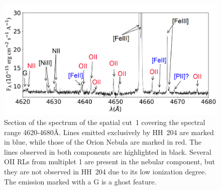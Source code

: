 \documentclass[twocolumn]{aastex63}
\begin{document}
\begin{figure}
\centering
\includegraphics[width=\columnwidth]{range_of_rls.pdf}
\caption{Section of the spectrum of the spatial cut~1 covering the spectral range 4620-4680\AA. Lines emitted exclusively by HH~204 are marked in blue, while those of the Orion Nebula are marked in red. The lines observed in both components are highlighted in black. Several O\thinspace II RLs from multiplet 1 are present in the nebular component, but they are not observed in HH~204 due to its low ionization degree. The emission marked with a G is a ghost feature.}
\label{fig:range_of_rls}
\end{figure}
\end{document}
